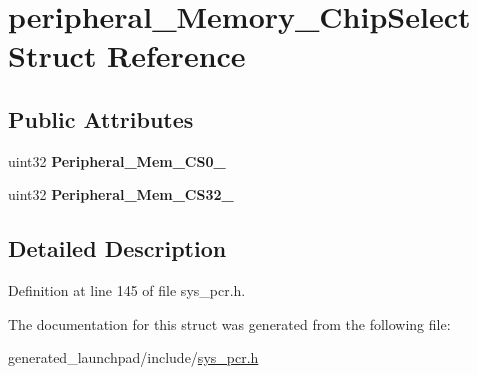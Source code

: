 \hypertarget{structperipheral__Memory__ChipSelect}{}\section{peripheral\+\_\+\+Memory\+\_\+\+Chip\+Select Struct Reference}
\label{structperipheral__Memory__ChipSelect}
\subsection*{Public Attributes}
\begin{DoxyCompactItemize}
\item 
\mbox{\label{structperipheral__Memory__ChipSelect_a8fc97a8af0abd4334b9f3855cbe2633b}} 
uint32 {\bfseries Peripheral\+\_\+\+Mem\+\_\+\+C\+S0\+\_}
\item 
\mbox{\label{structperipheral__Memory__ChipSelect_a22c2d3a419746d3bde6a6426209e8cf7}} 
uint32 {\bfseries Peripheral\+\_\+\+Mem\+\_\+\+C\+S32\+\_}
\end{DoxyCompactItemize}


\subsection{Detailed Description}


Definition at line 145 of file sys\+\_\+pcr.\+h.



The documentation for this struct was generated from the following file\+:\begin{DoxyCompactItemize}
\item 
generated\+\_\+launchpad/include/\mbox{\hyperlink{sys__pcr_8h}{sys\+\_\+pcr.\+h}}\end{DoxyCompactItemize}
